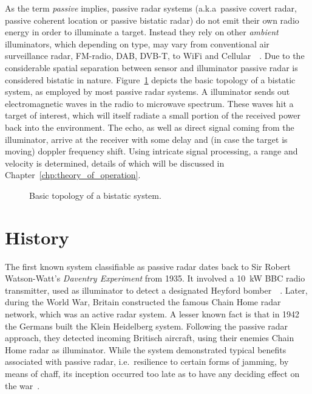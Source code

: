 As the term \emph{passive} implies, passive radar systems (a.k.a\ passive covert radar, passive coherent location or passive bistatic radar) do not emit their own radio energy in order to illuminate a target. Instead they rely on other \emph{ambient} illuminators, which depending on type, may vary from conventional air surveillance radar, FM-radio, DAB, DVB-T, to WiFi and Cellular~\cite[pp.~48--77]{Malanowski2019}\ \cite{Kuschel2013}. Due to the considerable spatial separation between sensor and illuminator passive radar is considered bistatic in nature. Figure~\ref{fig:topology} depicts the basic topology of a bistatic system, as employed by most passive radar systems. A illuminator sends out electromagnetic waves in the radio to microwave spectrum. These waves hit a target of interest, which will itself radiate a small portion of the received power back into the environment. The echo, as well as direct signal coming from the illuminator, arrive at the receiver with some delay and (in case the target is moving) doppler frequency shift. Using intricate signal processing, a range and velocity is determined, details of which will be discussed in Chapter~\ref{chp:theory_of_operation}.

\begin{figure}
    \centering
    \begin{tikzpicture}
        
    \end{tikzpicture}
    \caption{Basic topology of a bistatic system.}\label{fig:topology}
\end{figure}

\section{History}

The first known system classifiable as passive radar dates back to Sir Robert Watson-Watt's \emph{Daventry Experiment} from 1935. It involved a \SI{10}{\kilo\watt} BBC radio transmitter, used as illuminator to detect a designated Heyford bomber~\cite[pp.~5--6]{Malanowski2019}~\cite{Kuschel2013}. Later, during the  World War, Britain constructed the famous Chain Home radar network, which was an active radar system. A lesser known fact is that in 1942 the Germans built the Klein Heidelberg system. Following the passive radar approach, they detected incoming Britisch aircraft, using their enemies Chain Home radar as illuminator. While the system demonstrated typical benefits associated with passive radar, i.e.\ resilience to certain forms of jamming, by means of chaff, its inception occurred too late as to have any deciding effect on the war~\cite{Griffiths2010}.

